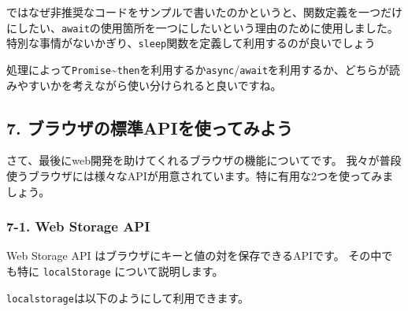 ではなぜ非推奨なコードをサンプルで書いたのかというと、関数定義を一つだけにしたい、\texttt{await}の使用箇所を一つにしたいという理由のために使用しました。
特別な事情がないかぎり、\texttt{sleep}関数を定義して利用するのが良いでしょう

処理によって\texttt{Promise}\textasciitilde{}\texttt{then}を利用するか\texttt{async}/\texttt{await}を利用するか、どちらが読みやすいかを考えながら使い分けられると良いですね。

\subsection{7.
ブラウザの標準APIを使ってみよう}\label{ux30d6ux30e9ux30a6ux30b6ux306eux6a19ux6e96apiux3092ux4f7fux3063ux3066ux307fux3088ux3046}

さて、最後にweb開発を助けてくれるブラウザの機能についてです。
我々が普段使うブラウザには様々なAPIが用意されています。特に有用な2つを使ってみましょう。

\subsubsection{7-1. Web Storage API}\label{web-storage-api}

Web Storage API はブラウザにキーと値の対を保存できるAPIです。
その中でも特に \texttt{localStorage} について説明します。

\texttt{localstorage}は以下のようにして利用できます。

